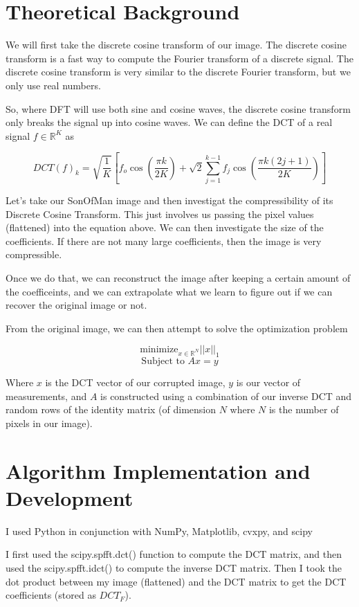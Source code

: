 \documentclass[11pt]{amsart}
\begin{document}
\section{Theoretical Background}\label{sec:theory}

We will first take the discrete cosine transform of our image. 
The discrete cosine transform is a fast way to compute the Fourier transform of a discrete signal.
The discrete cosine transform is very similar to the discrete Fourier transform, but we 
only use real numbers. 

So, where DFT will use both sine and cosine waves, the discrete 
cosine transform only breaks the signal up into cosine waves. We can define 
the DCT of a real signal $f \in \mathbb{R}^K$ as 

\[DCT(f)_k = \sqrt{\frac{1}{K}}[f_o\cos(\frac{\pi k}{2K}) + \sqrt{2}\sum_{j = 1}^{k-1}{f_j\cos(\frac{\pi k(2j + 1)}{2K})}]\]

Let's take our SonOfMan image and then investigat the compressibility of its 
Discrete Cosine Transform. This just involves us passing the pixel values (flattened) 
into the equation above. We can then investigate the size of the coefficients. If there are 
not many large coefficients, then the image is very compressible. 

Once we do that, we can reconstruct the image after keeping a certain amount of 
the coefficeints, and we can extrapolate what we learn to figure out if we can recover the original image or not. 

From the original image, we can then attempt to solve the optimization problem 

\[\text{minimize}_{x \in \mathbb{R}^N} ||x||_1\]
\[\text{Subject to } Ax = y\]

Where $x$ is the DCT vector of our corrupted image, $y$ is 
our vector of measurements, and $A$ is constructed using a combination 
of our inverse DCT and random rows of the identity matrix (of dimension $N$ where $N$ is the 
number of pixels in our image).



\section{Algorithm Implementation and Development}\label{sec:algorithms}
I used Python in conjunction with NumPy, Matplotlib, cvxpy, and scipy

I first used the scipy.spfft.dct() function to compute the DCT matrix,
and then used the scipy.spfft.idct() to compute the inverse DCT matrix. Then I took 
the dot product between my image (flattened) and the DCT matrix to get the DCT coefficients
(stored as $DCT_F$).
\end{document}
